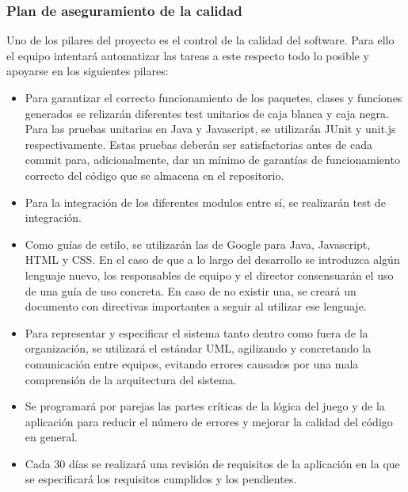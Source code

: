\subsubsection{Plan de aseguramiento de la calidad}
Uno de los pilares del proyecto es el control de la calidad del software. Para ello el equipo intentará automatizar las tareas a este respecto todo lo posible y apoyarse en los siguientes pilares:
\begin{itemize}
\item{Para garantizar el correcto funcionamiento de los paquetes, clases y funciones generados se relizarán diferentes test unitarios de caja blanca y caja negra. Para las pruebas unitarias en Java y Javascript, se utilizarán JUnit y unit.js respectivamente. Estas pruebas deberán ser satisfactorias antes de cada commit para, adicionalmente, dar un mínimo de garantías de funcionamiento correcto del código que se almacena en el repositorio.}
\item{Para la integración de los diferentes modulos entre sí, se realizarán test de integración.}
\item{Como guías de estilo, se utilizarán las de Google para Java, Javascript, HTML y CSS. En el caso de que a lo largo del desarrollo se introduzca algún lenguaje nuevo, los responsables de equipo y el director consensuarán el uso de una guía de uso concreta. En caso de no existir una, se creará un documento con directivas importantes a seguir al utilizar ese lenguaje.}
\item{Para representar y especificar el sistema tanto dentro como fuera de la organización, se utilizará el estándar UML, agilizando y concretando la comunicación entre equipos, evitando errores causados por una mala comprensión de la arquitectura del sistema.}
\item{Se programará por parejas las partes críticas de la lógica del juego y de la aplicación para reducir el número de errores y mejorar la calidad del código en general.}
\item{Cada 30 días se realizará una revisión de requisitos de la aplicación en la que se especificará los requisitos cumplidos y los pendientes.}
\end{itemize}
